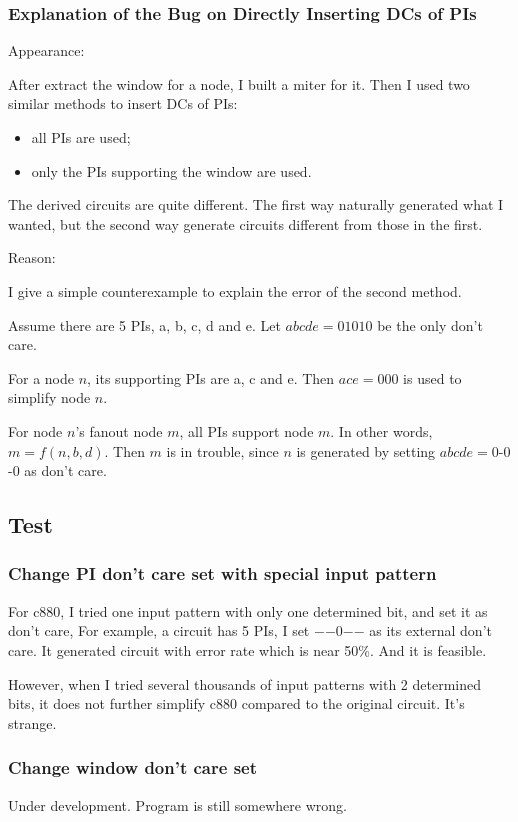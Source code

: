 \documentclass{rpt}
\begin{document}
\subsubsection{Explanation of the Bug on Directly Inserting DCs of PIs}
Appearance:

After extract the window for a node,
I built a miter for it.
Then I used two similar methods to insert DCs of PIs:
\begin{itemize}
    \item all PIs are used;
    \item only the PIs supporting the window are used.
\end{itemize}
The derived circuits are quite different.
The first way naturally generated what I wanted,
but the second way generate circuits different from those in the first.

Reason:

I give a simple counterexample to explain the error of the second method.

Assume there are 5 PIs, a, b, c, d and e.
Let $abcde=01010$ be the only don't care.

For a node $n$,
its supporting PIs are a, c and e.
Then $ace=000$ is used to simplify node $n$.

For node $n$'s fanout node $m$,
all PIs support node $m$.
In other words, $m=f(n, b, d)$.
Then $m$ is in trouble,
since $n$ is generated by setting $abcde=0$-$0$-$0$ as don't care.

\subsection{Test}
\subsubsection{Change PI don't care set with special input pattern}
For c880,
I tried one input pattern with only one determined bit,
and set it as don't care,
For example,
a circuit has 5 PIs,
I set $-$$-$0$-$$-$ as its external don't care.
It generated circuit with error rate which is near 50\%.
And it is feasible.

However,
when I tried several thousands of input patterns with 2 determined bits,
it does not further simplify c880 compared to the original circuit.
It's strange.

\subsubsection{Change window don't care set}
Under development.
Program is still somewhere wrong.
\end{document}
